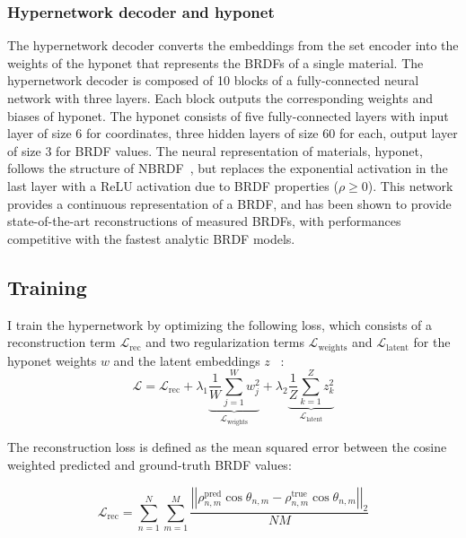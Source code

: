\subsubsection{Hypernetwork decoder and hyponet} %
The hypernetwork decoder converts the embeddings from the set encoder into the weights of the hyponet that represents the BRDFs of a single material. The hypernetwork decoder is composed of 10 blocks of a fully-connected neural network with three layers. Each block outputs the corresponding weights and biases of hyponet. The hyponet consists of five fully-connected layers with input layer of size 6 for coordinates, three hidden layers of size 60 for each, output layer of size 3 for BRDF values. The neural representation of materials, hyponet, follows the structure of NBRDF~\cite{sztrajman2021neural}, but replaces the exponential activation in the last layer with a ReLU activation due to BRDF properties ($\rho \ge 0$). This network provides a continuous representation of a BRDF, and has been shown to provide state-of-the-art reconstructions of measured BRDFs, with performances competitive with the fastest analytic BRDF models.


\subsection{Training}
\label{sec:traindet}


I train the hypernetwork by optimizing the following loss, which consists of a reconstruction term $\mathcal{L}_\text{rec}$ and two regularization terms $\mathcal{L}_\text{weights}$ and $\mathcal{L}_\text{latent}$ for the hyponet weights $w$ and the latent embeddings $z$ ~\cite{ha2017hypernetworks}:
\begin{equation}
    \mathcal{L} = \mathcal{L}_\text{rec} +
              \lambda_1 \underbrace{\frac{1}{W} \sum_{j=1}^W w^2_j}_{\mathcal{L}_\text{weights}} +
              \lambda_2 \underbrace{\frac{1}{Z} \sum_{k=1}^Z z^2_k}_{\mathcal{L}_\text{latent}}
    \label{eq:loss}
\end{equation}

The reconstruction loss is defined as the mean squared error between the cosine weighted predicted and ground-truth BRDF values:

\begin{equation}
    \mathcal{L}_{\text{rec}} = \sum_{n=1}^{N}\sum_{m=1}^{M}\frac{\left|\left|\rho^{\text{pred}}_{n, m} \cos{\theta_{n, m}} - \rho^{\text{true}}_{n, m} \cos{\theta_{n, m}}\right|\right|_{2}}{NM}
    \label{eq:Lrec}
\end{equation}

